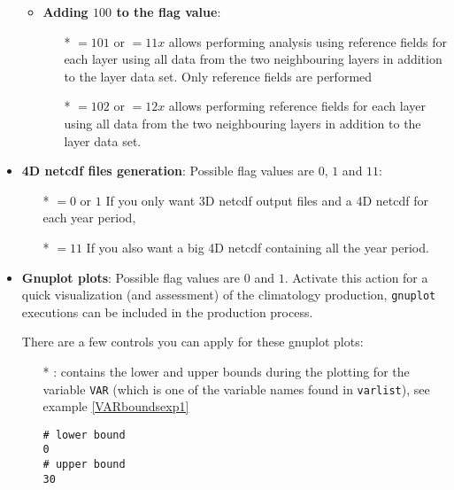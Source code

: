\begin{itemize}
\begin{itemize}
\begin{itemize}
              \end{itemize}
  \item  {\bf Adding $100$ to the flag value}:
              \begin{itemize}
               \item[*] $=101$ or $=11x$ allows performing analysis using reference fields for each layer using all data from the two neighbouring layers in addition to the layer data set. Only reference fields are performed
               \item[*] $=102$ or $=12x$ allows performing reference fields for each layer using all data from the two neighbouring layers in addition to the layer data set.
              \end{itemize}
   \end{itemize}
\item {\bf 4D netcdf files generation}: Possible flag values are $0$, $1$ and $11$:
                \begin{itemize}
                \item[*] $=0$ or $1$ If you only want 3D netcdf output files and a 4D netcdf for each year period,
                \item[*] $=11$ If you also want a big 4D netcdf containing all the year period.
                \end{itemize}
\item {\bf Gnuplot plots}: Possible flag values are $0$ and $1$. Activate this action for a quick visualization (and assessment) of the climatology production, {\tt gnuplot} executions can be included in the production process.\par 
There are a few controls you can apply for these gnuplot plots:
\begin{itemize}
\item[*] : contains the lower and upper bounds during the plotting for the variable {\tt VAR} 
(which is one of the variable names found in {\tt varlist}), see example \ref{VARboundsexp1}
\begin{center}
\begin{exfile}[H] %
\begin{footnotesize}
\begin{verbatim}
# lower bound
0
# upper bound
30
\end{verbatim}
\end{footnotesize}
\caption{}
\label{VARboundsexp1}
\end{exfile}
\end{center}

\end{itemize}
\end{itemize}
